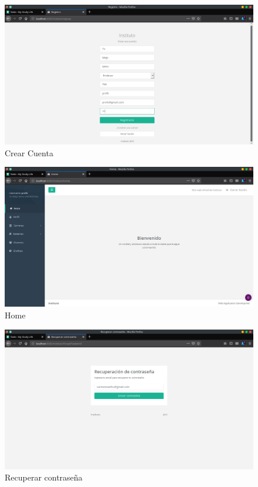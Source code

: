\documentclass[a4paper,12pt]{article}
\begin{document}
\begin{figure}[H]
\begin{center}
 \includegraphics[width=\textwidth]{crear.png}
 \caption{Crear Cuenta}
 \label{fig:crear}
\end{center}
\end{figure}

\begin{figure}[H]
\begin{center}
 \includegraphics[width=\textwidth]{home.png}
 \caption{Home}
 \label{fig:home}
\end{center}
\end{figure}

\begin{figure}[H]
\begin{center}
 \includegraphics[width=\textwidth]{recuperar.png}
 \caption{Recuperar contraseña}
 \label{fig:recuperar}
\end{center}
\end{figure}
\end{document}
